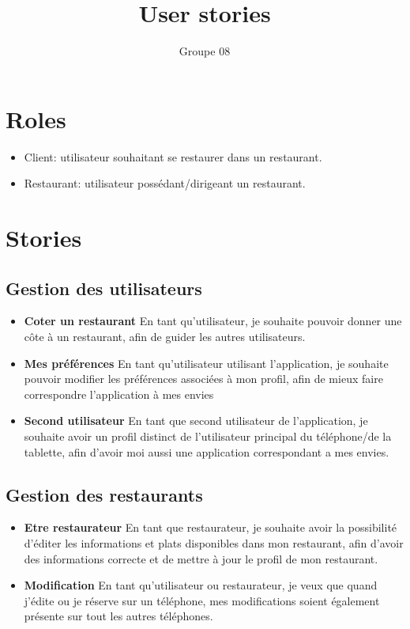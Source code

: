 \documentclass[10pt,a4paper]{article}
\title{User stories}
\author{Groupe 08}
\begin{document}
\maketitle
\section{Roles}
\begin{itemize}
\item Client: utilisateur souhaitant se restaurer dans un restaurant.
\item Restaurant: utilisateur possédant/dirigeant un restaurant.
\end{itemize}
\section{Stories}
\subsection{Gestion des utilisateurs}
\begin{itemize}
\item \textbf{Coter un restaurant} En tant qu'utilisateur, je souhaite pouvoir donner une côte à un restaurant, afin de guider les autres utilisateurs.
\item \textbf{Mes préférences} En tant qu'utilisateur utilisant l'application, je souhaite pouvoir modifier les préférences associées à mon profil, afin de mieux faire correspondre l'application à mes envies
\item \textbf{Second utilisateur} En tant que second utilisateur de l'application, je souhaite avoir un profil distinct de l'utilisateur principal du téléphone/de la tablette, afin d'avoir moi aussi une application correspondant a mes envies.
\end{itemize}
\subsection{Gestion des restaurants}
\begin{itemize}
\item \textbf{Etre restaurateur} En tant que restaurateur, je souhaite avoir la possibilité d'éditer les informations et plats disponibles dans mon restaurant, afin d'avoir des informations correcte et de mettre à jour le profil de mon restaurant.
\item \textbf{Modification} En tant qu'utilisateur ou restaurateur, je veux que quand j'édite ou je réserve sur un téléphone, mes modifications soient également présente sur tout les autres téléphones.
\end{itemize}
\end{document}
